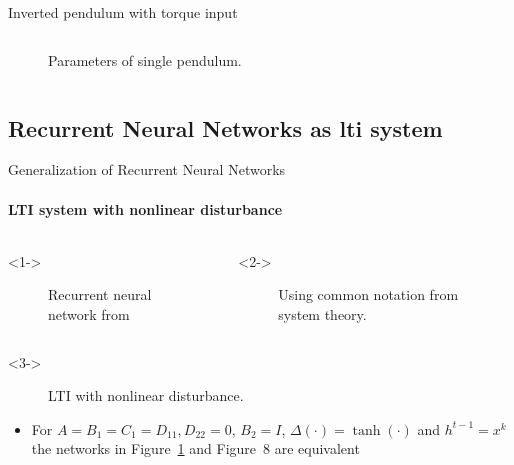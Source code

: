 \documentclass[8pt, t,
aspectratio=169,%
]{beamer}
\begin{document}
\begin{frame}{Inverted pendulum with torque input}
\begin{columns}[]
        \vspace{-0.7cm}
        \begin{figure}
            
            \caption{Parameters of single pendulum.}
        \end{figure}
    \end{columns}

\end{frame}

\subsection{Recurrent Neural Networks as \gls{lti} system}
\begin{frame}{Generalization of Recurrent Neural Networks}
    \framesubtitle{LTI system with nonlinear disturbance}
    \vspace{-0.5cm}
    \begin{columns}
        \begin{onlyenv}<1->
            \begin{figure}
                \centering
                
                \caption{Recurrent neural network from \cite{goodfellow2016deep}}
                \label{fig:rnn}
            \end{figure}
        \end{onlyenv}
    
        \begin{onlyenv}<2->
            \begin{figure}
                \centering
                
                \caption{Using common notation from system theory.}
                \label{fig:rnn_intermediate}
            \end{figure}
        \end{onlyenv}
    \end{columns}

    \begin{onlyenv}<3->
        \begin{figure}
            \centering
            \label{fig:lti_cmp}
            
            \caption{LTI with nonlinear disturbance.}
        \end{figure}  
        \vspace{-0.3cm}  
        \vfill
        \begin{block}{}
            \begin{itemize}
                \item For $A=B_1=C_1=D_{11}, D_{22} = 0$, $B_2 = I$, $\Delta(\cdot) = \tanh(\cdot)$ and $h^{t-1} = x^k$ the networks in Figure~\ref{fig:rnn} and Figure~8 are equivalent
            \end{itemize}
        \end{block}

    \end{onlyenv}
\end{frame}
\end{document}
